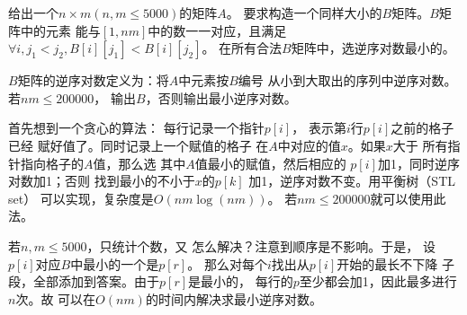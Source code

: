 \begin{prob}
	给出一个$n \times m(n, m \le 5000)$的矩阵$A$。
	要求构造一个同样大小的$B$矩阵。$B$矩阵中的元素
	能与$[1, nm]$中的数一一对应，且满足
	$\forall i, j_1 < j_2, B[i][j_1] < B[i][j_2]$。
	在所有合法$B$矩阵中，选逆序对数最小的。\par
	$B$矩阵的逆序对数定义为：将$A$中元素按$B$编号
	从小到大取出的序列中逆序对数。若$nm \le 200000$，
	输出$B$，否则输出最小逆序对数。
\end{prob}

\begin{sol}
	首先想到一个贪心的算法：
	每行记录一个指针$p[i]$，
	表示第$i$行$p[i]$之前的格子已经
	赋好值了。同时记录上一个赋值的格子
	在$A$中对应的值$x$。如果$x$大于
	所有指针指向格子的$A$值，那么选
	其中$A$值最小的赋值，然后相应的
	$p[i]$加1，同时逆序对数加1；否则
	找到最小的不小于$x$的$p[k]$
	加1，逆序对数不变。用平衡树（STL set）
	可以实现，复杂度是$O(nm \log(nm))$。
	若$nm \le 200000$就可以使用此法。
	\par 若$n,m \le 5000$，只统计个数，又
	怎么解决？注意到顺序是不影响。于是，
	设$p[i]$对应$B$中最小的一个是$p[r]$。
	那么对每个$i$找出从$p[i]$开始的最长不下降
	子段，全部添加到答案。由于$p[r]$是最小的，
	每行的$p$至少都会加1，因此最多进行$n$次。故
	可以在$O(nm)$的时间内解决求最小逆序对数。

\end{sol}

